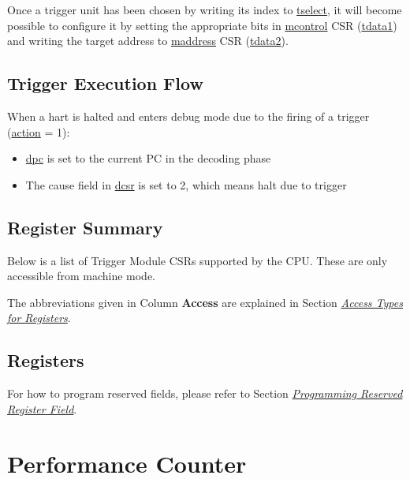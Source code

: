 \documentclass[main\_\_EN.tex]{subfiles}
\begin{document}
Once a trigger unit has been chosen by writing its index to \hyperref[regdesc:LPTSELECT]{tselect}, it will become possible to configure it by setting the appropriate bits in \hyperref[regdesc:LPMCONTROL]{mcontrol} CSR (\hyperref[regdesc:LPTDATA1]{tdata1}) and writing the target address to \hyperref[regdesc:LPMADDRESS]{maddress} CSR (\hyperref[regdesc:LPTDATA2]{tdata2}).


\subsection{Trigger Execution Flow}
\label{sec:ulp-hwt-suggest-op}

When a hart is halted and enters debug mode due to the firing of a trigger (\hyperref[fielddesc:LPMCONTROLACTION]{action} = 1):
\begin{itemize}
    \item \hyperref[regdesc:LPDPC]{dpc} is set to the current PC in the decoding phase
    \item The cause field in \hyperref[regdesc:LPDCSR]{dcsr} is set to 2, which means halt due to trigger
\end{itemize}


\subsection{Register Summary}
\label{sec:ulp-hwt-reg-summ}

Below is a list of Trigger Module CSRs supported by the CPU. These are only accessible from machine mode.

The abbreviations given in Column \textbf{Access} are explained in Section \hyperref[glossary-access-types]{\textit{Access Types for Registers}}.



\subsection{Registers}
\label{sec:ulp-hwt-reg}

For how to program reserved fields, please refer to Section \hyperref[programming-reserved-field]{\textit{Programming Reserved Register Field}}.




\section{Performance Counter}
\end{document}
